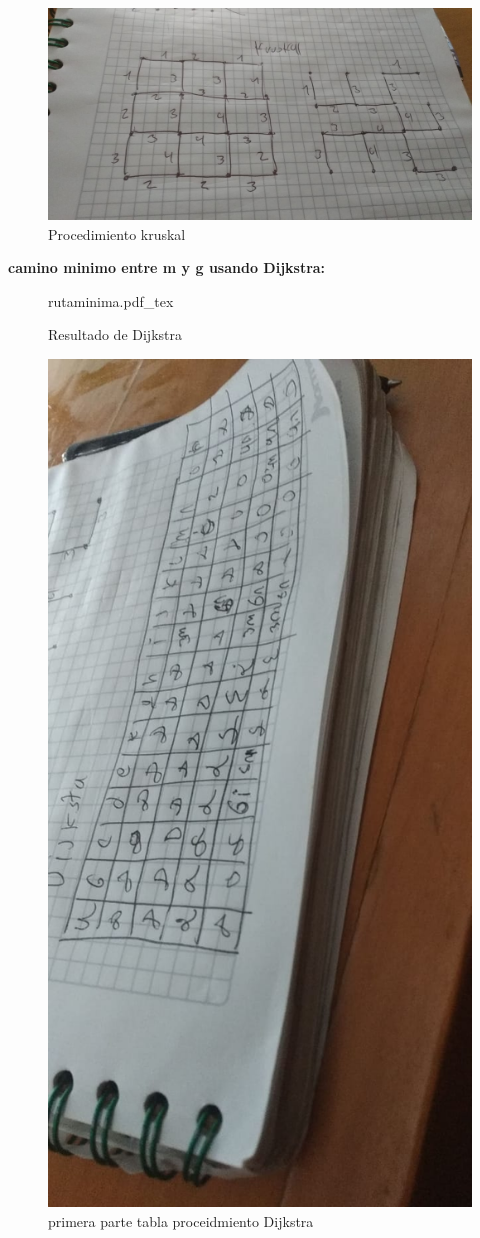 \documentclass[10pt,a4paper]{article} %
\newcommand{\incfig}[1]{%
    \def\svgwidth{\columnwidth}
    {#1.pdf_tex}
}
\begin{document}
            \begin{figure}[h!]
                \centering
                \includegraphics[width=0.8\linewidth]{kruskal.jpeg}
                \caption{Procedimiento kruskal}
                \label{fig}
            \end{figure}




        \textbf{camino minimo entre m y g usando Dijkstra:}
        \\
            \begin{figure}[ht]
                \centering
                \incfig{rutaminima}
                \caption{Resultado de Dijkstra}
                \label{fig:rutaminima}
            \end{figure}
            \begin{figure}[h!]
                \centering
                \includegraphics[width=0.4\linewidth]{tabladij.jpeg}
                \caption{primera parte tabla proceidmiento Dijkstra}
                \label{fig}
            \end{figure}
\end{document}
